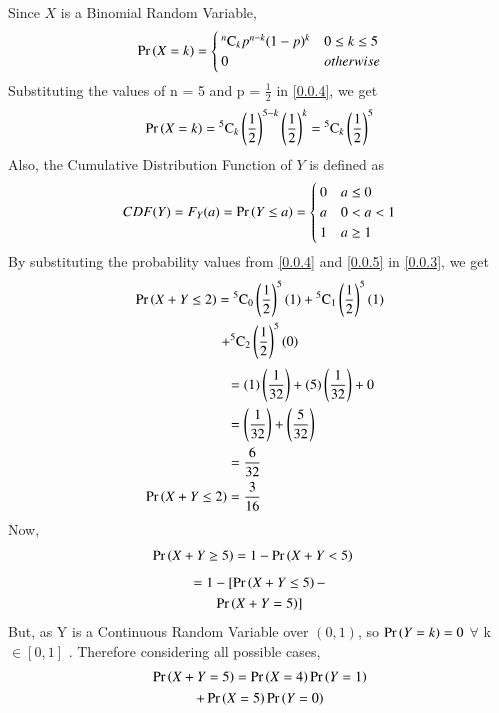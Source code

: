 \documentclass[journal,12pt,twocolumn]{IEEEtran}
\newcommand{\comb}[2]{{}^{#1}\mathrm{C}_{#2}}
\begin{document}
Since $X$ is a Binomial Random Variable,
\begin{align}
\pr{X = k} = \begin{cases}
\comb{n}{k}p^{n-k}(1-p)^{k} & 0 \leq k \leq 5 \\
0 & otherwise
\end{cases} \label{0.0.4}
\end{align}
Substituting the values of n = 5 and p = $\frac{1}{2}$ in \eqref{0.0.4}, we get
\begin{align*}
\pr{X = k} = \comb{5}{k} \left(\frac{1}{2} \right)^{5-k} \left(\frac{1}{2} \right)^{k} = \comb{5}{k} \left(\frac{1}{2} \right)^{5}    
\end{align*}
Also, the Cumulative Distribution Function of $Y$ is
defined as
\begin{align}
CDF(Y) = F_Y(a) = \Pr\left(Y \leq a\right) = \begin{cases}
0 & a \leq 0 \\
a & 0 < a < 1 \\ 
1 & a \geq 1
\end{cases} \label{0.0.5}   
\end{align}
By substituting the probability values from \eqref{0.0.4} and \eqref{0.0.5} in \eqref{0.0.3}, we get
\begin{multline}
\pr{X + Y \leq 2} = \comb{5}{0} \left(\frac{1}{2} \right)^{5}(1) + \comb{5}{1} \left(\frac{1}{2} \right)^{5}(1) \\ + \comb{5}{2} \left(\frac{1}{2} \right)^{5}(0)    
\end{multline}
\begin{align}
&= (1)\left(\frac{1}{32} \right) + (5)\left(\frac{1}{32} \right) + 0 \\
&= \left(\frac{1}{32} \right) + \left(\frac{5}{32} \right) \\
&= \frac{6}{32} \\
\Pr\left(X + Y \leq 2\right) &= \frac{3}{16}    
\end{align}
Now,
\begin{align}
\Pr\left(X + Y \geq 5\right) &= 1 - \Pr\left(X + Y <  5\right)
\end{align}
\begin{multline}
= 1 - [\Pr\left(X + Y \leq 5\right) - \\ \Pr\left(X + Y = 5\right)] \label{0.0.12}    
\end{multline}
But, as Y is a Continuous Random Variable over $(0,1)$, so $\Pr\left(Y = k \right) = 0$  $\forall$ k $\in [0,1]$ . Therefore considering all possible cases,
\begin{multline}
\Pr\left(X + Y = 5\right) = \Pr\left(X = 4\right)\Pr\left(Y = 1\right) \\ + \Pr\left(X = 5\right)\Pr\left(Y = 0\right)    
\end{multline}
\end{document}
